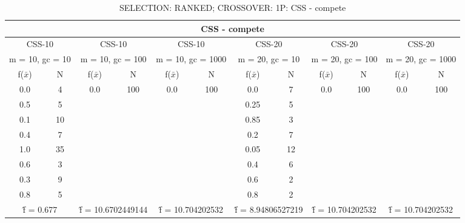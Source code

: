 \begin{table}[H]
	\centering
	\caption{SELECTION: RANKED; CROSSOVER: 1P: CSS - compete}
	\begin{adjustbox}{width=1\textwidth}
		\begin{tabular}{ |c|c||c|c||c|c||c|c||c|c||c|c| }
			\hline
			\multicolumn{12}{|c|}{CSS - compete} \\
			\hline
			\multicolumn{2}{|c||}{CSS-10} & \multicolumn{2}{c||}{CSS-10} & \multicolumn{2}{c||}{CSS-10} & \multicolumn{2}{c||}{CSS-20} & \multicolumn{2}{c||}{CSS-20} & \multicolumn{2}{c|}{CSS-20}\\
			\hline
			\multicolumn{2}{|c||}{m = 10, gc = 10} & \multicolumn{2}{c||}{m = 10, gc = 100} & \multicolumn{2}{c||}{m = 10, gc = 1000} & \multicolumn{2}{c||}{m = 20, gc = 10} & \multicolumn{2}{c||}{m = 20, gc = 100} & \multicolumn{2}{c|}{m = 20, gc = 1000}\\
			\hline
			f($\bar{x}$) & N & f($\bar{x}$) & N & f($\bar{x}$) & N & f($\bar{x}$) & N & f($\bar{x}$) & N & f($\bar{x}$) & N\\
			\hline
			\hline
			0.0 & 4 & 0.0 & 100 & 0.0 & 100 & 0.0 & 7 & 0.0 & 100 & 0.0 & 100\\
			0.5 & 5 &   &   &   &   & 0.25 & 5 &   &   &   &  \\
			0.1 & 10 &   &   &   &   & 0.85 & 3 &   &   &   &  \\
			0.4 & 7 &   &   &   &   & 0.2 & 7 &   &   &   &  \\
			1.0 & 35 &   &   &   &   & 0.05 & 12 &   &   &   &  \\
			0.6 & 3 &   &   &   &   & 0.4 & 6 &   &   &   &  \\
			0.3 & 9 &   &   &   &   & 0.6 & 2 &   &   &   &  \\
			0.8 & 5 &   &   &   &   & 0.8 & 2 &   &   &   &  \\
			\hline
			\multicolumn{2}{|c||}{\^{f} = 0.677} & \multicolumn{2}{c||}{\^{f} = 10.6702449144} & \multicolumn{2}{c||}{\^{f} = 10.704202532} & \multicolumn{2}{c||}{\^{f} = 8.94806527219} & \multicolumn{2}{c||}{\^{f} = 10.704202532} & \multicolumn{2}{c|}{\^{f} = 10.704202532}\\
			\hline
		\end{tabular}
	\end{adjustbox}
\end{table}
